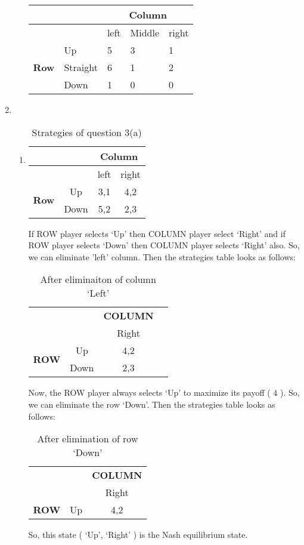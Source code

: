 \documentclass[a4paper,12pt]{article}
\begin{document}
\begin{enumerate}
\begin{enumerate}
\begin{tabular}{@{}l|l|lll@{}}
& & \multicolumn{3}{c}{\bfseries Column}\\
\toprule
& & left & Middle & right\\
\hline
\multirow{3}{*}{\bfseries Row} & Up & 5 & 3 & 1\\
 & Straight & 6 & 1 & 2\\
 & Down & 1 & 0 & 0\\
\bottomrule
\end{tabular}
\end{enumerate}

\item%
\begin{enumerate}
\item
\begin{table}[H]
\centering
\begin{tabular}{@{}cccc@{}}
& & \multicolumn{2}{c}{\bfseries Column}\\
\toprule
& & left & right\\
\multirow{2}{*}{\bfseries Row} & Up & 3,1 & 4,2\\
 & Down & 5,2 & 2,3\\
\bottomrule
\end{tabular}
\caption{Strategies of question 3(a)}
\end{table}

If ROW player selects `Up' then COLUMN player select `Right' and if ROW player selects `Down' then COLUMN player selects `Right' also. So, we can eliminate 'left' column.
Then the strategies table looks as follows:

\begin{table}[H]
\centering
\begin{tabular}{@{}cccc@{}}
& & {\bfseries COLUMN}\\
& & Right\\
\toprule
\multirow{2}{*}{\bfseries ROW} & Up & 4,2\\
 & Down & 2,3\\
\bottomrule
\end{tabular}
\caption{After eliminaiton of column `Left'}
\end{table}

Now, the ROW player always selects `Up' to maximize its payoff ( $4$ ). So, we can eliminate the row `Down'. Then the strategies table looks as follows:

\begin{table}[H]
\centering
\begin{tabular}{@{}ccc@{}}
\toprule
\multicolumn{2}{c}{} & {\bfseries COLUMN}\\
& & Right\\
{\bfseries ROW} & Up & 4,2\\
\bottomrule
\end{tabular}
\caption{After elimination of row `Down'}
\end{table}
So, this state ( `Up', `Right' ) is the Nash equilibrium state.


\end{enumerate}
\end{enumerate}
\end{document}
